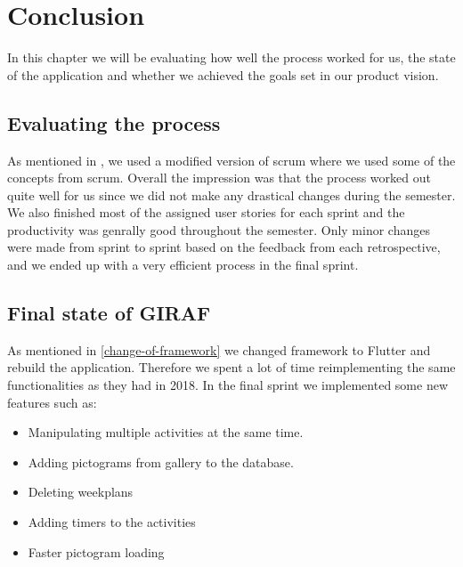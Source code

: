 \chapter{Conclusion}
In this chapter we will be evaluating how well the process worked for us, the state of the application and whether we achieved the goals set in our product vision.

\section{Evaluating the process}
As mentioned in , we used a modified version of scrum where we used some of the concepts from scrum. Overall the impression was that the process worked out quite well for us since we did not make any drastical changes during the semester. We also finished most of the assigned user stories for each sprint and the productivity was genrally good throughout the semester. Only minor changes were made from sprint to sprint based on the feedback from each retrospective, and we ended up with a very efficient process in the final sprint. 

\section{Final state of GIRAF}
As mentioned in \autoref{change-of-framework} we changed framework to Flutter and rebuild the application.
Therefore we spent a lot of time reimplementing the same functionalities as they had in 2018. In the final sprint we implemented some new features such as:
\begin{itemize}
    \item Manipulating multiple activities at the same time.
    \item Adding pictograms from gallery to the database.
    \item Deleting weekplans
    \item Adding timers to the activities
    \item Faster pictogram loading
\end{itemize}


